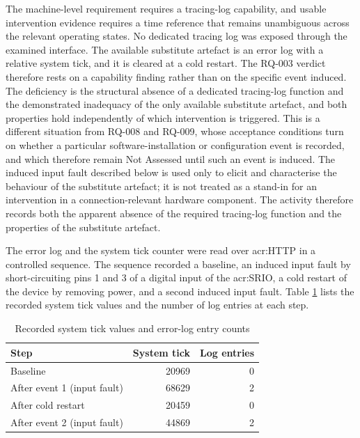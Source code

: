 The machine-level requirement requires a tracing-log capability, and usable intervention evidence requires a time reference that remains unambiguous across the relevant operating states. No dedicated tracing log was exposed through the examined interface. The available substitute artefact is an error log with a relative system tick, and it is cleared at a cold restart. The RQ-003 verdict therefore rests on a capability finding rather than on the specific event induced. The deficiency is the structural absence of a dedicated tracing-log function and the demonstrated inadequacy of the only available substitute artefact, and both properties hold independently of which intervention is triggered. This is a different situation from RQ-008 and RQ-009, whose acceptance conditions turn on whether a particular software-installation or configuration event is recorded, and which therefore remain Not Assessed until such an event is induced. The induced input fault described below is used only to elicit and characterise the behaviour of the substitute artefact; it is not treated as a stand-in for an intervention in a connection-relevant hardware component. The activity therefore records both the apparent absence of the required tracing-log function and the properties of the substitute artefact.

The error log and the system tick counter were read over \gls{acr:HTTP} in a controlled sequence. The sequence recorded a baseline, an induced input fault by short-circuiting pins 1 and 3 of a digital input of the \gls{acr:SRIO}, a cold restart of the device by removing power, and a second induced input fault. Table \ref{tab:rq003_evidence} lists the recorded system tick values and the number of log entries at each step.

\begin{table}[H]
	\centering
	\small
	\caption{Recorded system tick values and error-log entry counts}
	\label{tab:rq003_evidence}
	\begin{tabular}{l r r}
		\toprule
		\textbf{Step} & \textbf{System tick} & \textbf{Log entries} \\
		\midrule
		Baseline & 20969 & 0 \\
		After event 1 (input fault) & 68629 & 2 \\
		After cold restart & 20459 & 0 \\
		After event 2 (input fault) & 44869 & 2 \\
		\bottomrule
	\end{tabular}
\end{table}


